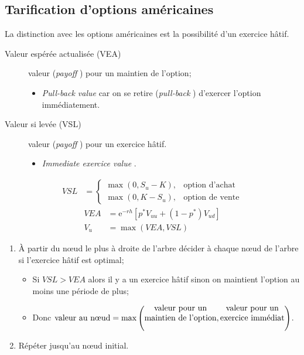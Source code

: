 \documentclass[10pt, french]{article}
\begin{document}
\begin{multicols*}{2}
\subsection*{Tarification d'options américaines}
La distinction avec les options américaines est la possibilité d'un exercice hâtif.

\begin{description}
	\item[Valeur espérée actualisée (VEA)]	valeur (\og \textit{payoff} \fg{}) pour un maintien de l'option;
		\begin{itemize}[leftmargin = *]
		\item	\og \textit{Pull-back value}\fg{} car on se retire (\og \textit{pull-back} \fg{}) d'exercer l'option immédiatement.
		\end{itemize}
	\item[Valeur si levée (VSL)]	valeur (\og \textit{payoff} \fg{}) pour un exercice hâtif.
		\begin{itemize}[leftmargin = *]
		\item	\og \textit{Immediate exercice value} \fg{}.
		\end{itemize}
\end{description}

\begin{distributions}
\begin{align*}
VSL	&=	
	\begin{cases}
	\max(0, S_{u} - K),	&	\text{option d'achat}	\\
	\max(0, K - S_{u}),	&	\text{option de vente}
	\end{cases}
\end{align*}
\begin{align*}
	VEA	
	&=		\textrm{e}^{-r h}\left[ p^{*}V_{uu} + (1 - p^{*})V_{ud} \right]	\\
	V_{u}	
	&=	\max(VEA, VSL)
\end{align*}
\end{distributions}

\begin{algo2}
\begin{enumerate}[leftmargin = *]
	\item	À partir du nœud le plus à droite de l'arbre décider à chaque nœud de l'arbre si l'exercice hâtif est optimal;
		\begin{itemize}[leftmargin = *]
		\item	Si $VSL > VEA$ alors il y a un exercice hâtif sinon on maintient l'option au moins une période de plus;
		\item	Donc $\text{valeur au nœud} = \max\left(\text{\shortstack{valeur pour un\\ maintien de l'option}}, \text{\shortstack{valeur pour un\\ exercice immédiat}}\right)$.
		\end{itemize}
	\item	Répéter jusqu'au nœud initial.
\end{enumerate}
\end{algo2}


\end{multicols*}
\end{document}
